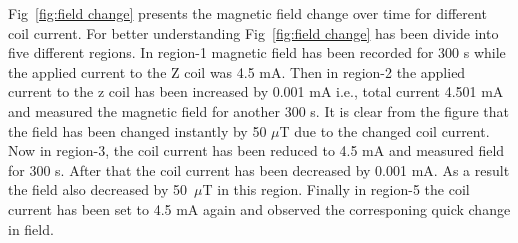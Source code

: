 \begin{itemize}
 Fig~\ref{fig:field change} presents the magnetic field change over time for different coil current. For better understanding Fig~\ref{fig:field change} has been divide into five different regions. In region-1 magnetic field  has been recorded for 300 s while the applied current to the Z coil was 4.5 mA. Then in region-2 the applied current to the z coil has been increased by 0.001 mA i.e., total current 4.501 mA and measured the magnetic field for another 300 s. It is clear from the figure that the field has been changed instantly by 50 $\mu$T due to the changed coil current. Now in region-3, the coil current has been reduced to 4.5 mA and measured field for 300 s. After that the coil current has been decreased by 0.001 mA. As a result the field also decreased by 50~$\mu$T in this region.  Finally in region-5 the coil current has been set to 4.5 mA again and observed the corresponing quick change in field.


   \end{itemize}
